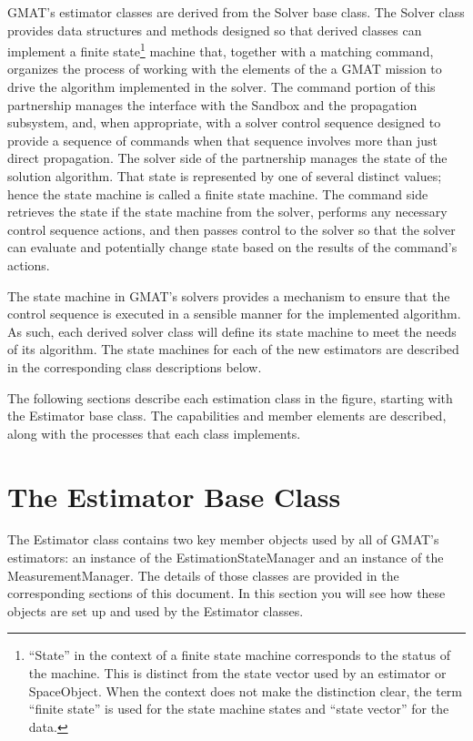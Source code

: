 GMAT's estimator classes are derived from the Solver base class.  The Solver class provides data structures and methods designed so that derived classes can implement a finite state\footnote{``State'' in the context of a finite state machine corresponds to the status of the machine.  This is distinct from the state vector used by an estimator or SpaceObject.  When the context does not make the distinction clear, the term ``finite state'' is used for the state machine states and ``state vector'' for the data.} machine that, together with a matching command, organizes the process of working with the elements of the a GMAT mission to drive the algorithm implemented in the solver.  The command portion of this partnership manages the interface with the Sandbox and the propagation subsystem, and, when appropriate, with a solver control sequence designed to provide a sequence of commands when that sequence involves more than just direct propagation.  The solver side of the partnership manages the state of the solution algorithm.  That state is represented by one of several distinct values; hence the state machine is called a finite state machine.  The command side retrieves the state if the state machine from the solver, performs any necessary control sequence actions, and then passes control to the solver so that the solver can evaluate and potentially change state based on the results of the command's actions.

The state machine in GMAT's solvers provides a mechanism to ensure that the control sequence is executed in a sensible manner for the implemented algorithm.  As such, each derived solver class will define its state machine to meet the needs of its algorithm.  The state machines for each of the new estimators are described in the corresponding class descriptions below.

The following sections describe each estimation class in the figure, starting with the Estimator base class.  The capabilities and member elements are described, along with the processes that each class implements.

\section{The Estimator Base Class}

The Estimator class contains two key member objects used by all of GMAT's estimators: an instance of the EstimationStateManager and an instance of the MeasurementManager.  The details of those classes are provided in the corresponding sections of this document.  In this section you will see how these objects are set up and used by the Estimator classes.

